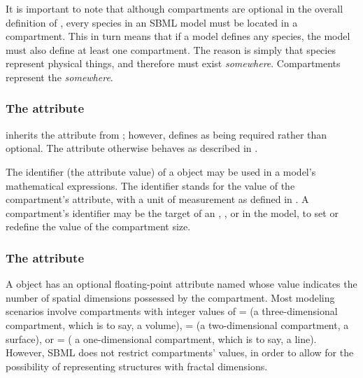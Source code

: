It is important to note that although compartments are optional in
the overall definition of \Model, every species in an SBML model
must be located in a compartment.  This in turn means that if a
model defines any species, the model must also define at least one
compartment.  The reason is simply that species represent physical
things, and therefore must exist \emph{somewhere}.  Compartments
represent the \emph{somewhere}.


\begin{blockChanged}
\subsubsection{The  attribute}

\Compartment inherits the  attribute from \SBase; however, \Compartment defines  as being required rather than optional.  The attribute otherwise behaves as described in .

The identifier (the  attribute value) of a \Compartment object may be used in a model's mathematical expressions.  The identifier stands for the value of the compartment's  attribute, with a unit of measurement as defined in .  A compartment's identifier may be the target of an \InitialAssignment, \EventAssignment, or \Rule in the model, to set or redefine the value of the compartment size.

\end{blockChanged}


\subsubsection{The  attribute}
\label{sec:compartment-spatialdimensions}

A \Compartment object has an optional floating-point attribute
named  whose value indicates the number
of spatial dimensions possessed by the compartment.  Most modeling
scenarios involve compartments with integer values of
= (\ie a three-dimensional
compartment, which is to say, a volume),
= (\ie a two-dimensional
compartment, a surface), or = (\ie
a one-dimensional compartment, which is to say, a line).  However,
SBML \thisL does not restrict compartments'
 values, in order to allow for the
possibility of representing structures with fractal dimensions.

